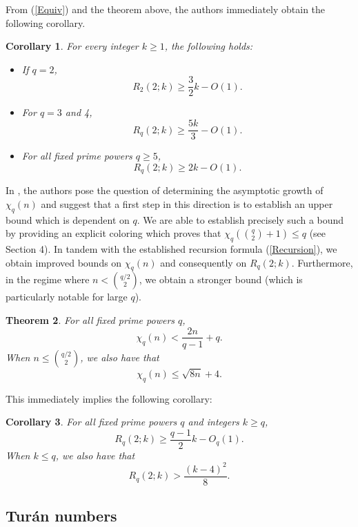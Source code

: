 \documentclass[12pt]{article}
\newtheorem{thm}{Theorem}[section]
\newtheorem{cor}[thm]{Corollary}
\begin{document}
From (\ref{Equiv}) and the theorem above, the authors immediately obtain the following corollary.

\begin{cor}{\cite[Lemma 3]{BishnoiCamesRavi2025}}
    For every integer $k \geq 1$, the following holds: 
    \begin{itemize}
        \item If $q = 2$, 
        $$
        R_2(2; k) \geq \frac{3}{2}k - O(1).
        $$
        \item For $q = 3$ and 4,
    $$
    R_q(2; k) \geq \frac{5k}{3} - O(1).
    $$
        \item For all fixed prime powers $q \geq  5$, 
    $$
    R_q(2; k) \geq  2k  - O(1).
    $$
    \end{itemize}
\end{cor}

In \cite[Section 6]{BishnoiCamesRavi2025}, the authors pose the question of determining the asymptotic growth of $\chi_q(n)$ and suggest that a first step in this direction is to establish an upper bound which is dependent on $q$. We are able to establish precisely such a bound by providing an explicit coloring which proves that $\chi_q(\binom{q}{2} + 1) \leq q$ (see Section 4). In tandem with the established recursion formula (\ref{Recursion}), we obtain improved bounds on $\chi_q(n)$ and consequently on $R_q(2; k)$. Furthermore, in the regime where $n < \binom{q/2}{2}$, we obtain a stronger bound (which is particularly notable for large $q$).

\begin{thm}\label{ChromNum}
    For all fixed prime powers $q$,
    $$
    \chi_q(n) < \frac{2n}{q-1} + q.
    $$
    When $n \leq \binom{q/2}{2}$, we also have that 
    $$
    \chi_q(n) \leq \sqrt{8n} + 4.
    $$
\end{thm}

This immediately implies the following corollary:

\begin{cor}
    For all fixed prime powers $q$ and integers $k \geq q$,
    $$
    R_q(2; k) \geq \frac{q-1}{2}k - O_q(1).
    $$
    When $k \leq q$, we also have that 
    $$
    R_q(2; k) > \frac{(k - 4)^2}{8}.
    $$
\end{cor}




\subsection{Tur\'{a}n numbers}
\end{document}
